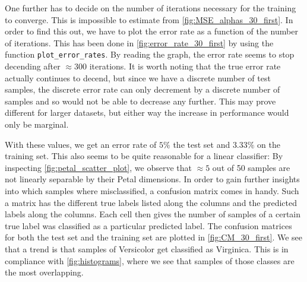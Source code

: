 \documentclass{article}
\begin{document}
One further has to decide on the number of iterations necessary for the training to converge. This
is impossible to estimate from \autoref{fig:MSE_alphas_30_first}. In order to find this out,
we have to plot the error rate as a function of the number of iterations. This has been done in
\autoref{fig:error_rate_30_first} by using the function \lstinline{plot_error_rates}. By reading the graph,
the error rate seems to stop decending after $\approx 300$ iterations. It is worth noting that the true error rate
actually continues to decend, but since we have a discrete number of test samples, the discrete error rate
can only decrement by a discrete number of samples and so would not be able to decrease any further.
This may prove different for larger datasets, but either way the increase in performance would only be
marginal.

With these values, we get an error rate of $5\%$ the test set and $3.33\%$ on the training set. This
also seems to be quite reasonable for a linear classifier: By inspecting \autoref{fig:petal_scatter_plot},
we observe that $\approx 5$ out of 50 samples are not linearly separable by their Petal dimensions.
In order to gain further insights into which samples where misclassified, a confusion matrix comes in
handy. Such a matrix has the different true labels listed along the columns and the predicted labels
along the columns. Each cell then gives the number of samples of a certain true label was classified
as a particular predicted label. The confusion matrices for both the test set and the training set are
plotted in \autoref{fig:CM_30_first}. We see that a trend is that samples of Versicolor get classified
as Virginica. This is in compliance with \autoref{fig:histograms}, where we see that samples of
those classes are the most overlapping.
\end{document}
